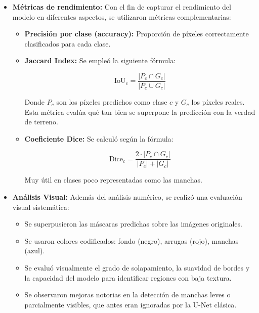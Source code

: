 \begin{enumerate}
\begin{itemize}
\begin{itemize}
    \item \textbf{Métricas de rendimiento:}
    Con el fin de capturar el rendimiento del modelo en diferentes aspectos, se utilizaron métricas complementarias:
    
    \begin{itemize}
    \item \textbf{Precisión por clase (accuracy):} Proporción de píxeles correctamente clasificados para cada clase.
    
    \item \textbf{Jaccard Index:}
    Se empleó la siguiente fórmula:
    
    \begin{equation}\label{eq:iou_clase_mit}
    \text{IoU}_c = \frac{|P_c \cap G_c|}{|P_c \cup G_c|}
    \end{equation}
    
    Donde $P_c$ son los píxeles predichos como clase $c$ y $G_c$ los píxeles reales. Esta métrica evalúa qué tan bien se superpone la predicción con la verdad de terreno.
    
    \item \textbf{Coeficiente Dice:}
    Se calculó según la fórmula:
    
    \begin{equation}\label{eq:dice_clase_mit}
    \text{Dice}_c = \frac{2 \cdot |P_c \cap G_c|}{|P_c| + |G_c|}
    \end{equation}
    
    Muy útil en clases poco representadas como las manchas.
    
    \end{itemize}
    
    \item \textbf{Análisis Visual:}
    Además del análisis numérico, se realizó una evaluación visual sistemática:
    
    \begin{itemize}
    \item Se superpusieron las máscaras predichas sobre las imágenes originales.
    \item Se usaron colores codificados: fondo (negro), arrugas (rojo), manchas (azul).
    \item Se evaluó visualmente el grado de solapamiento, la suavidad de bordes y la capacidad del modelo para identificar regiones con baja textura.
    \item Se observaron mejoras notorias en la detección de manchas leves o parcialmente visibles, que antes eran ignoradas por la U-Net clásica.
    \end{itemize}
    

\end{itemize}
\end{itemize}
\end{enumerate}
